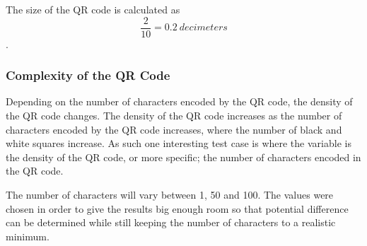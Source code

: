 The size of the QR code is calculated as \[\frac{2}{10} = 0.2~decimeters\].

       
		

\subsubsection{Complexity of the QR Code}
Depending on the number of characters encoded by the QR code, the density of the QR code changes. The density of the QR code increases as the number of characters encoded by the QR code increases, where the number of black and white squares increase. As such one interesting test case is where the variable is the density of the QR code, or more specific; the number of characters encoded in the QR code.

The number of characters will vary between 1, 50 and 100. The values were chosen in order to give the results big enough room so that potential difference can be determined while still keeping the number of characters to a realistic minimum. %

       
